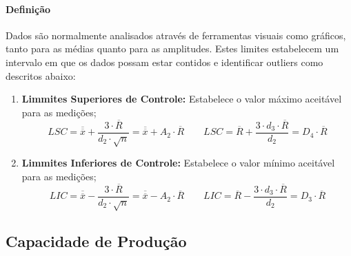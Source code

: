 \documentclass{article}
\begin{document}
            \paragraph{Definição}Dados são normalmente analisados através de ferramentas visuais como gráficos, tanto para as médias quanto para as amplitudes. Estes limites estabelecem um intervalo em que os dados possam estar contidos e identificar outliers como descritos abaixo:
                \begin{enumerate}[rightmargin = \leftmargin, noitemsep]
                    \item \textbf{Limmites Superiores de Controle:} Estabelece o valor máximo aceitável para as medições;
                        \begin{equation}
                            \boxed{
                                LSC = 
                                \overline{\overline{x}} + \frac{3\cdot\overline{R}}{d_{2}\cdot\sqrt{n}} = 
                                \overline{\overline{x}} + A_{2}\cdot\overline{R}
                            }
                            \qquad
                            \boxed{
                                LSC = 
                                \overline{R} + \frac{3\cdot d_{3}\cdot\overline{R}}{d_{2}} = 
                                D_{4}\cdot\overline{R}
                            }
                        \end{equation}
                    \item \textbf{Limmites Inferiores de Controle:} Estabelece o valor mínimo aceitável para as medições;
                        \begin{equation}
                            \boxed{
                                LIC = 
                                \overline{\overline{x}} - \frac{3\cdot\overline{R}}{d_{2}\cdot\sqrt{n}} = 
                                \overline{\overline{x}} - A_{2}\cdot\overline{R}
                            }
                            \qquad
                            \boxed{
                                LIC = 
                                \overline{R} - \frac{3\cdot d_{3}\cdot\overline{R}}{d_{2}} = 
                                D_{3}\cdot\overline{R}
                            }
                        \end{equation}
                \end{enumerate}

        \subsection{Capacidade de Produção}
\end{document}
